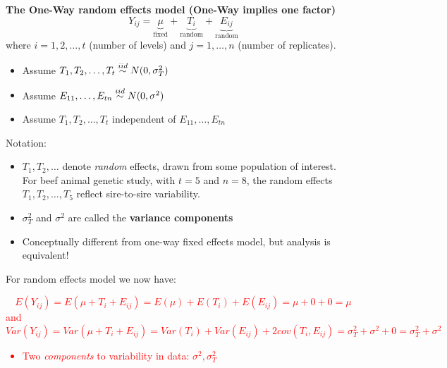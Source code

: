 \textbf{The One-Way random effects model (One-Way implies one factor)}
$$ Y_{ij} = \underbrace{\mu}_{\text{fixed}} + \underbrace{T_i}_{\text{random}} + \underbrace{E_{ij}}_{\text{random}}$$
where $i=1,2,\ldots,t$ (number of levels) and $j=1,\ldots,n$ (number of replicates).
\begin{itemize}
\item Assume $T_1,T_2,\ldots,T_t \stackrel{iid}{\sim} N(0,\sigma_T^2)$
\item Assume $E_{11},\ldots,E_{tn} \stackrel{iid}{\sim} N(0,\sigma^2)$
\item Assume $T_1,T_2,\ldots,T_t$ independent of $E_{11},\ldots,E_{tn}$
\end{itemize}
Notation:
\begin{itemize}
\item $T_1,T_2,\ldots$ denote {\em random} effects, drawn from some population of interest. \\For beef animal genetic study, with $t=5$ and $n=8$, the random effects $T_1,T_2,\ldots,T_5$ reflect sire-to-sire variability.  
\item $\sigma_T^2$ and $\sigma^2$ are called the \textbf{variance components}
\item Conceptually different from one-way fixed effects model, but analysis is equivalent!
\end{itemize}

For random effects model we now have:
\textcolor{red}{$$E(Y_{ij})=E(\mu+T_i+E_{ij})=E(\mu)+E(T_i)+E(E_{ij})=\mu + 0 + 0 =\mu$$
and
$$Var(Y_{ij})=Var(\mu+T_i+E_{ij})=Var(T_i)+Var(E_{ij})+2cov(T_i,E_{ij})=\sigma^2_T+\sigma^2+0=\sigma^2_T+\sigma^2$$
\begin{itemize}
\item Two {\em components} to variability in data: $\sigma^2, \sigma_T^2$
\end{itemize}}~\\

\newpage


